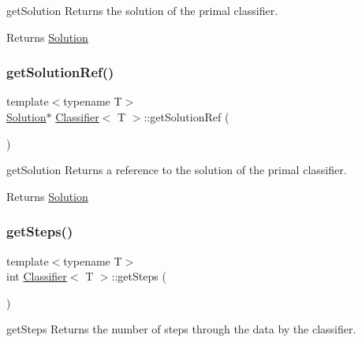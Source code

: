 get\+Solution Returns the solution of the primal classifier. 

\begin{DoxyReturn}{Returns}
\mbox{\hyperlink{class_solution}{Solution}} 
\end{DoxyReturn}
\mbox{\label{class_classifier_a4845fd932adb55becf78bfa4fccbea59}} 
\subsubsection{\texorpdfstring{get\+Solution\+Ref()}{getSolutionRef()}}
{\footnotesize\ttfamily template$<$typename T$>$ \\
\mbox{\hyperlink{class_solution}{Solution}}$\ast$ \mbox{\hyperlink{class_classifier}{Classifier}}$<$ T $>$\+::get\+Solution\+Ref (\begin{DoxyParamCaption}{ }\end{DoxyParamCaption})\hspace{0.3cm}{\ttfamily [inline]}}



get\+Solution Returns a reference to the solution of the primal classifier. 

\begin{DoxyReturn}{Returns}
\mbox{\hyperlink{class_solution}{Solution}} 
\end{DoxyReturn}
\mbox{\label{class_classifier_a6e6d5041d6945bc62581323d2d3b5ab1}} 
\subsubsection{\texorpdfstring{get\+Steps()}{getSteps()}}
{\footnotesize\ttfamily template$<$typename T$>$ \\
int \mbox{\hyperlink{class_classifier}{Classifier}}$<$ T $>$\+::get\+Steps (\begin{DoxyParamCaption}{ }\end{DoxyParamCaption})\hspace{0.3cm}{\ttfamily [inline]}}



get\+Steps Returns the number of steps through the data by the classifier. 

